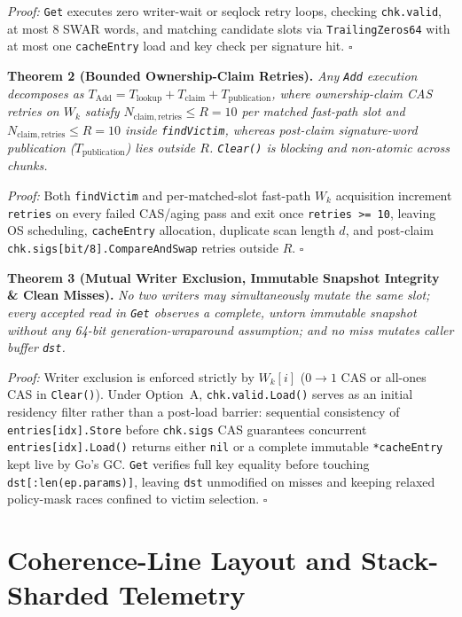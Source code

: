 \documentclass[11pt,a4paper]{article}
\begin{document}
\textit{Proof:} \texttt{Get} executes zero writer-wait or seqlock retry loops, checking \texttt{chk.valid}, at most 8 SWAR words, and matching candidate slots via \texttt{TrailingZeros64} with at most one \texttt{cacheEntry} load and key check per signature hit. $\square$

\textbf{Theorem 2 (Bounded Ownership-Claim Retries).} \textit{Any \texttt{Add} execution decomposes as $T_{\mathrm{Add}} = T_{\mathrm{lookup}} + T_{\mathrm{claim}} + T_{\mathrm{publication}}$, where ownership-claim CAS retries on $W_k$ satisfy $N_{\mathrm{claim,retries}} \le R = 10$ per matched fast-path slot and $N_{\mathrm{claim,retries}} \le R = 10$ inside \texttt{findVictim}, whereas post-claim signature-word publication ($T_{\mathrm{publication}}$) lies outside $R$. \texttt{Clear()} is blocking and non-atomic across chunks.}

\textit{Proof:} Both \texttt{findVictim} and per-matched-slot fast-path $W_k$ acquisition increment \texttt{retries} on every failed CAS/aging pass and exit once \texttt{retries >= 10}, leaving OS scheduling, \texttt{cacheEntry} allocation, duplicate scan length $d$, and post-claim \texttt{chk.sigs[bit/8].CompareAndSwap} retries outside $R$. $\square$

\textbf{Theorem 3 (Mutual Writer Exclusion, Immutable Snapshot Integrity \& Clean Misses).} \textit{No two writers may simultaneously mutate the same slot; every accepted read in \texttt{Get} observes a complete, untorn immutable snapshot without any 64-bit generation-wraparound assumption; and no miss mutates caller buffer \texttt{dst}.}

\textit{Proof:} Writer exclusion is enforced strictly by $W_k[i]$ ($0 \to 1$ CAS or all-ones CAS in \texttt{Clear()}). Under Option~A, \texttt{chk.valid.Load()} serves as an initial residency filter rather than a post-load barrier: sequential consistency of \texttt{entries[idx].Store} before \texttt{chk.sigs} CAS guarantees concurrent \texttt{entries[idx].Load()} returns either \texttt{nil} or a complete immutable \texttt{*cacheEntry} kept live by Go's GC. \texttt{Get} verifies full key equality before touching \texttt{dst[:len(ep.params)]}, leaving \texttt{dst} unmodified on misses and keeping relaxed policy-mask races confined to victim selection. $\square$

\section{Coherence-Line Layout and Stack-Sharded Telemetry}
\end{document}
